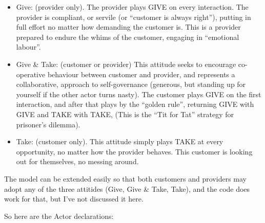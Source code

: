 \documentclass[
  letterpaper,
  DIV=11,
  numbers=noendperiod]{scrartcl}
\providecommand{\tightlist}{%
  \setlength{\itemsep}{0pt}\setlength{\parskip}{0pt}}\usepackage{longtable,booktabs,array}
\begin{document}
\begin{itemize}
\tightlist
\item
  Give: (provider only). The provider plays GIVE on every interaction.
  The provider is compliant, or servile (or ``customer is always
  right''), putting in full effort no matter how demanding the customer
  is. This is a provider prepared to endure the whims of the customer,
  engaging in ``emotional labour''.
\item
  Give \& Take: (customer or provider) This attitude seeks to encourage
  co-operative behaviour between customer and provider, and represents a
  collaborative, approach to self-governance (generous, but standing up
  for yourself if the other actor turns nasty). The customer plays GIVE
  on the first interaction, and after that plays by the ``golden rule'',
  returning GIVE with GIVE and TAKE with TAKE, (This is the ``Tit for
  Tat'' strategy for prisoner's dilemma).
\item
  Take: (customer only). This attitude simply plays TAKE at every
  opportunity, no matter how the provider behaves. This customer is
  looking out for themselves, no messing around.
\end{itemize}

The model can be extended easily so that both customers and providers
may adopt any of the three attitides (Give, Give \& Take, Take), and the
code does work for that, but I've not discussed it here.

So here are the Actor declarations:
\end{document}
